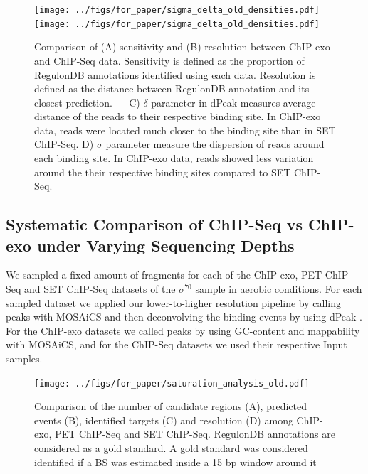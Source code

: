\documentclass[11pt]{article}\usepackage[]{graphicx}\usepackage[]{color}
\begin{document}
\begin{figure}[H]
\centering
   \texttt{[image: ../figs/for\_paper/sigma\_delta\_old\_densities.pdf]}
   \texttt{[image: ../figs/for\_paper/sigma\_delta\_old\_densities.pdf]} 

   \caption{Comparison of (A) sensitivity and (B) resolution between
     ChIP-exo and ChIP-Seq data. Sensitivity is defined as the
     proportion of RegulonDB annotations identified using each
     data. Resolution is defined as the distance between RegulonDB
     annotation and its closest prediction. $\quad$ C) $\delta$ parameter in
     dPeak measures average distance of the reads to their respective
     binding site. In ChIP-exo data, reads were located much closer to
     the binding site than in SET ChIP-Seq. D) $\sigma$ parameter
     measure the dispersion of reads around each binding site. In
     ChIP-exo data, reads showed less variation around the their
     respective binding sites compared to SET ChIP-Seq.}
  \label{fig:reso_all}
\end{figure}

\subsection{Systematic Comparison of ChIP-Seq vs ChIP-exo under
  Varying Sequencing Depths}
\label{sec:reco}



We sampled a fixed amount of fragments for each of the ChIP-exo, PET
ChIP-Seq and SET ChIP-Seq datasets of the $\sigma^{70}$ sample in
aerobic conditions. For each sampled dataset we applied our
lower-to-higher resolution pipeline by calling peaks with MOSAiCS
\cite{mosaics} and then deconvolving the binding events by using dPeak
\cite{dpeak}. For the ChIP-exo datasets we called peaks by using
GC-content and mappability with MOSAiCS, and for the ChIP-Seq datasets
we used their respective Input samples.

\begin{figure}[H]
  \centering
  \texttt{[image: ../figs/for\_paper/saturation\_analysis\_old.pdf]}
  \caption{Comparison of the number of candidate regions (A),
    predicted events (B), identified targets (C) and resolution (D)
    among ChIP-exo, PET ChIP-Seq and SET ChIP-Seq. RegulonDB
    annotations are considered as a gold standard. A gold standard was
    considered identified if a BS was estimated inside a 15
    bp window around it}
  \label{fig:design}
\end{figure}
\end{document}
